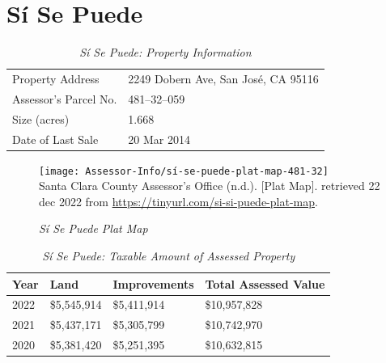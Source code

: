 
\clearpage
\section{Sí Se Puede}\label{sec:sí-se-puede-info}\indent

\begin{table}[htbp]
  \SingleSpacing%
  \caption[Sí Se Puede: Property Information]{\textit{Sí Se Puede: Property Information}}\label{tab:sí-se-puede-prop-info}
  \begin{tabular}{ll}
    \toprule
    Property Address      & 2249 Dobern Ave, San José, CA 95116 \\
    Assessor's Parcel No. &  481–32–059 \\
    Size (acres)          &  1.668\\
    Date of Last Sale     &  20 Mar 2014 \\
    \bottomrule
  \end{tabular}
\end{table}

\begin{figure}[hbtp]
  \centering
  \caption[Sí Se Puede Plat Map]{\textit{Sí Se Puede Plat Map}}\label{fig:sí-se-puede-plat-map}
    \texttt{[image: Assessor-Info/sí-se-puede-plat-map-481-32]}\\ %
  \footnotesize{Santa Clara County Assessor's Office (n.d.). [Plat Map]. retrieved 22 dec 2022 from \url{https://tinyurl.com/si-si-puede-plat-map}}.
\end{figure}

\begin{table}[htbp]
  \SingleSpacing%
  \caption[Sí Se Puede: Taxable Amount of Assessed Property]{\textit{Sí Se Puede: Taxable Amount of Assessed Property}}\label{tab:sí-se-puede-taxable-amount}
  \begin{tabular}{llll}
    \toprule
    Year & Land        & Improvements & Total Assessed Value \\
    \midrule
    2022 & \$5,545,914 & \$5,411,914  & \$10,957,828 \\
    2021 & \$5,437,171 & \$5,305,799  & \$10,742,970 \\
    2020 & \$5,381,420 & \$5,251,395  & \$10,632,815 \\
    \bottomrule
  \end{tabular}
\end{table}

